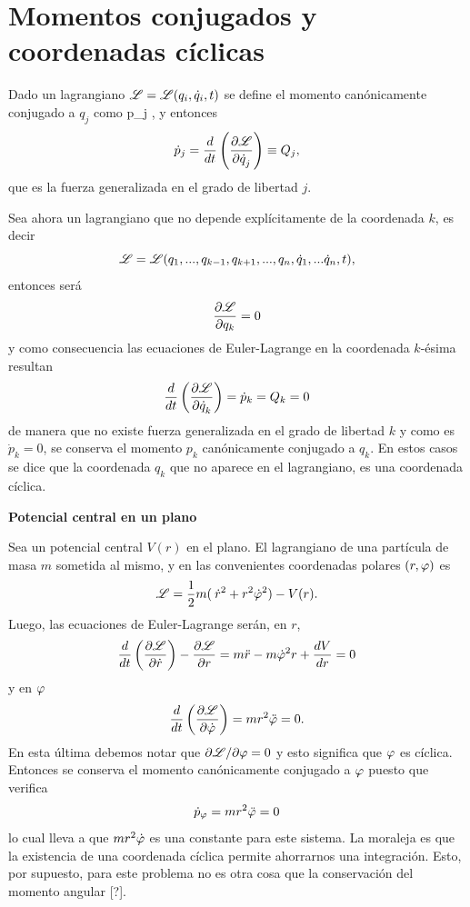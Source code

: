 \documentclass[10pt,oneside]{CBFT_book}
\begin{document}
\section{Momentos conjugados y coordenadas cíclicas} 

Dado un lagrangiano $\mathscr{L} = \mathscr{L}( q_i,\dot{q}_i, t )$ se define el momento canónicamente conjugado a $q_j$
como 
\be
	p_j \equiv {},
	\label{mom_canon_conj}
\ee
y entonces 
\[
	\dot{p}_j = \frac{d}{dt}\left( \frac{\partial^{\hspace{-0.05em}} {\mathscr{L}}}{\partial {\dot{q}_j}^{\hspace{-0.05em}}} \right) \equiv Q_j,
\]
que es la fuerza generalizada en el grado de libertad $j$.

Sea ahora un lagrangiano que no depende explícitamente de la coordenada $k$, es decir 
\[
	\mathscr{L} = \mathscr{L}( q_1,...,q_{k-1},q_{k+1},...,q_n,\dot{q}_1,...\dot{q}_n, t ),
\]
entonces será
\[
	\frac{\partial^{\hspace{-0.05em}} {\mathscr{L}}}{\partial {q_k}^{\hspace{-0.05em}}}= 0 
\]
y como consecuencia las ecuaciones de Euler-Lagrange en la coordenada $k$-ésima resultan 
\[
	\frac{d^{\hspace{-0.05em}} {}}{d {t}^{\hspace{-0.05em}}}\left( \frac{\partial^{\hspace{-0.05em}} {\mathscr{L}}}{\partial {\dot{q}_k}^{\hspace{-0.05em}}} \right) = \dot{ p }_k = Q_k = 0 
\]
de manera que no existe fuerza generalizada en el grado de libertad $k$ y como es $\dot{p}_k = 0$, se conserva 
el momento $p_k$ canónicamente conjugado a $q_k$.
En estos casos se dice que la coordenada $q_k$ que no aparece en el lagrangiano, es una coordenada
cíclica.

\begin{ejemplo}{\bf Potencial central en un plano}

Sea un potencial central $ V(r) $ en el plano. El lagrangiano de una partícula de masa $m$ sometida al mismo,
y en las convenientes coordenadas polares $(r,\varphi)$ es
\[
	\mathscr{L} = \frac{1}{2} m ( \:\dot{r}^2 + r^2 \dot{\varphi}^2 ) - V(r).
\]
Luego, las ecuaciones de Euler-Lagrange serán, en $r$,
\[
	\frac{d^{\hspace{-0.05em}} {}}{d {t}^{\hspace{-0.05em}}}\left( \frac{\partial^{\hspace{-0.05em}} {\mathscr{L}}}{\partial {\dot{r}}^{\hspace{-0.05em}}}\right) - \frac{\partial^{\hspace{-0.05em}} {\mathscr{L}}}{\partial {r}^{\hspace{-0.05em}}} =
	m\ddot{r} - m\dot{\varphi}^2r + \frac{d^{\hspace{-0.05em}} {V}}{d {r}^{\hspace{-0.05em}}} = 0
\]
y en $\varphi$
\[
	\frac{d^{\hspace{-0.05em}} {}}{d {t}^{\hspace{-0.05em}}}\left( \frac{\partial^{\hspace{-0.05em}} {\mathscr{L}}}{\partial {\dot{\varphi}}^{\hspace{-0.05em}}}\right) = mr^2\ddot{\varphi} = 0.
\]
En esta última debemos notar que $\partial \mathscr{L} / \partial \varphi = 0 $ y esto significa que $\varphi$ es cíclica.
Entonces se conserva el momento canónicamente conjugado a $\varphi$ puesto que verifica 
\[
	\dot{p}_\varphi = mr^2\ddot{\varphi} = 0
\]
lo cual lleva a que $ m r^2\dot{\varphi} $ es una constante para este sistema. La moraleja es que la existencia de una 
coordenada cíclica permite ahorrarnos una integración.
Esto, por supuesto, para este problema no es otra cosa que la conservación del momento angular [?].

\end{ejemplo}
\end{document}
